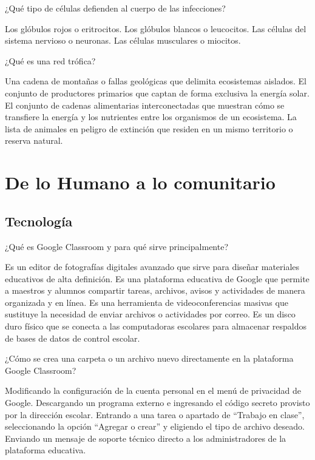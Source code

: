 \documentclass[12pt]{evaluasep}
\begin{document}
\begin{questions}
    \question ¿Qué tipo de células defienden al cuerpo de las infecciones?
   
    \begin{choices}
        \choice Los glóbulos rojos o eritrocitos.
        \CorrectChoice Los glóbulos blancos o leucocitos.
        \choice Las células del sistema nervioso o neuronas.
        \choice Las células musculares o miocitos.
    \end{choices}
    

    \question ¿Qué es una red trófica?
   
    \begin{choices}
        \choice Una cadena de montañas o fallas geológicas que delimita ecosistemas aislados.
        \choice El conjunto de productores primarios que captan de forma exclusiva la energía solar.
        \CorrectChoice El conjunto de cadenas alimentarias interconectadas que muestran cómo se transfiere la energía y los nutrientes entre los organismos de un ecosistema.
        \choice La lista de animales en peligro de extinción que residen en un mismo territorio o reserva natural.
    \end{choices}
	

\section{De lo Humano a lo comunitario}
\subsection{Tecnología}

\question ¿Qué es Google Classroom y para qué sirve principalmente?
    \begin{choices}
        \choice Es un editor de fotografías digitales avanzado que sirve para diseñar materiales educativos de alta definición.
        \CorrectChoice Es una plataforma educativa de Google que permite a maestros y alumnos compartir tareas, archivos, avisos y actividades de manera organizada y en línea.
        \choice Es una herramienta de videoconferencias masivas que sustituye la necesidad de enviar archivos o actividades por correo.
        \choice Es un disco duro físico que se conecta a las computadoras escolares para almacenar respaldos de bases de datos de control escolar.
    \end{choices}
    

    \question ¿Cómo se crea una carpeta o un archivo nuevo directamente en la plataforma Google Classroom?
    \begin{choices}
        \choice Modificando la configuración de la cuenta personal en el menú de privacidad de Google.
        \choice Descargando un programa externo e ingresando el código secreto provisto por la dirección escolar.
        \CorrectChoice Entrando a una tarea o apartado de ``Trabajo en clase'', seleccionando la opción ``Agregar o crear'' y eligiendo el tipo de archivo deseado.
        \choice Enviando un mensaje de soporte técnico directo a los administradores de la plataforma educativa.
    \end{choices}
    

\end{questions}
\end{document}
